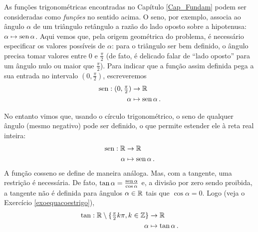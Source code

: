 \begin{ex}
 As funções trigonométricas encontradas no Capítulo \ref{Cap_Fundam} podem ser
consideradas como \emph{funções} no sentido acima. 
O seno, por exemplo, associa ao ângulo $\alpha$ de um triângulo retângulo a razão do lado
oposto sobre a hipotenusa: $\alpha\mapsto\operatorname{sen} \alpha$.
Aqui vemos que, pela origem geométrica do problema, é necessário especificar os valores
possíveis 
de $\alpha$: para o triângulo ser bem definido, o ângulo precisa tomar valores entre $0$ e 
 $\tfrac{\pi}{2}$ (de fato, é delicado falar de ``lado oposto'' para um ângulo nulo ou
maior que 
$\tfrac{\pi}{2}$). 
 Para indicar que a função assim definida pega a sua entrada no intervalo
$(0,\tfrac{\pi}{2})$, escreveremos
\begin{align*}
 \operatorname{sen}:(0,\tfrac{\pi}{2})&\to \mathbb{R}\\
\alpha&\mapsto \operatorname{sen} \alpha\,.
\end{align*}


No entanto vimos que, usando o círculo trigonométrico, o
seno
de qualquer ângulo (mesmo negativo) pode ser definido, o que permite estender ele à reta
real inteira:
\begin{align*}
 \operatorname{sen}:\mathbb{R}&\to \mathbb{R}\\
\alpha&\mapsto {\operatorname{sen}\alpha}\,.
\end{align*}
A função cosseno se define de maneira análoga. Mas, com a
tangente, uma restrição é necessária. 
 De fato, $\tan \alpha=\frac{\operatorname{sen} \alpha}{\cos \alpha}$ e, a divisão por zero sendo
proibida, a tangente não é definida para ângulos $\alpha\in \mathbb{R}$ tais que $\cos\alpha=0$.
Logo (veja o Exercício \ref{exoequacoestrigo}), 
\begin{align*}
 \tan:\mathbb{R}\setminus\{\tfrac{\pi}{2} k\pi,k\in\mathbb{Z}\}&\to \mathbb{R}\\
\alpha&\mapsto {\tan \alpha}\,.
\end{align*}
\end{ex}

